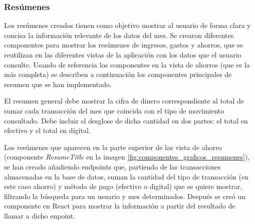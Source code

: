 \subsubsection{Resúmenes}
Los resúmenes creados tienen como objetivo mostrar al usuario de forma clara y concisa la información relevante de los datos del mes. Se crearon diferentes componentes para mostrar los resúmenes de ingresos, gastos y ahorros, que se reutilizan en las diferentes vistas de la aplicación con los datos que el usuario consulte. Usando de referencia los componentes en la vista de ahorros (que es la más completa) se describen a continuación los componentes principales de resumen que se han implementado.


El resumen general debe mostrar la cifra de dinero correspondiente al total de sumar cada transacción del mes que coincida con el tipo de movimiento consultado. Debe incluir el desglose de dicha cantidad en dos partes: el total en efectivo y el total en digital.

Los resúmenes que aparecen en la parte superior de las vista de ahorro (componente \textit{ResumeTitle} en la imagen \ref{fig:componentes_graficos_resumenes}), se han creado añadiendo endpoints que, partiendo de las transacciones almacenadas en la base de datos, suman la cantidad del tipo de transacción (en este caso ahorro) y método de pago (efectivo o digital) que se quiere mostrar, filtrando la búsqueda para un usuario y mes determinados. Después se creó un componente en React para mostrar la información a partir del resultado de llamar a dicho enpoint.

